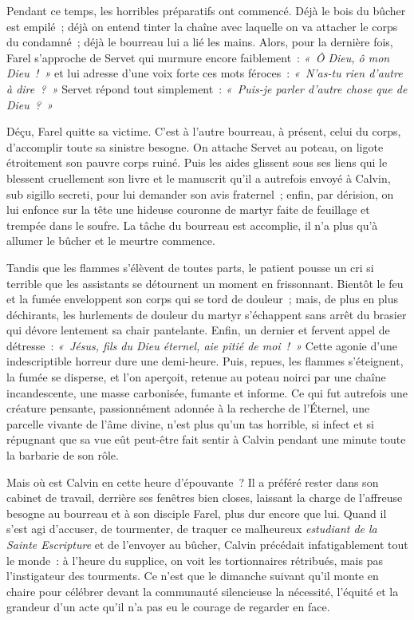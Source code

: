 \documentclass[french,twoside]{book} %
\newcommand\chapterclose{} %
\begin{document}
\noindent Pendant ce temps, les horribles préparatifs ont commencé. Déjà le bois du bûcher est empilé ; déjà on entend tinter la chaîne avec laquelle on va attacher le corps du condamné ; déjà le bourreau lui a lié les mains. Alors, pour la dernière fois, Farel s’approche de Servet qui murmure encore faiblement : \emph{« Ô Dieu, ô mon Dieu ! »} et lui adresse d’une voix forte ces mots féroces : \emph{« N’as-tu rien d’autre à dire ? »} Servet répond tout simplement : \emph{« Puis-je parler d’autre chose que de Dieu ? »}\par
Déçu, Farel quitte sa victime. C’est à l’autre bourreau, à présent, celui du corps, d’accomplir toute sa sinistre besogne. On attache Servet au poteau, on ligote étroitement son pauvre corps ruiné. Puis les aides glissent sous ses liens qui le blessent cruellement son livre et le manuscrit qu’il a autrefois envoyé à Calvin, sub sigillo secreti, pour lui demander son avis fraternel ; enfin, par dérision, on lui enfonce sur la tête une hideuse couronne de martyr faite de feuillage et trempée dans le soufre. La tâche du bourreau est accomplie, il n’a plus qu’à allumer le bûcher et le meurtre commence.\par
Tandis que les flammes s’élèvent de toutes parts, le patient pousse un cri si terrible que les assistants se détournent un moment en frissonnant. Bientôt le feu et la fumée enveloppent son corps qui se tord de douleur ; mais, de plus en plus déchirants, les hurlements de douleur du martyr s’échappent sans arrêt du brasier qui dévore lentement sa chair pantelante. Enfin, un dernier et fervent appel de détresse : \emph{« Jésus, fils du Dieu éternel, aie pitié de moi ! »} Cette agonie d’une indescriptible horreur dure une demi-heure. Puis, repues, les flammes s’éteignent, la fumée se disperse, et l’on aperçoit, retenue au poteau noirci par une chaîne incandescente, une masse carbonisée, fumante et informe. Ce qui fut autrefois une créature pensante, passionnément adonnée à la recherche de l’Éternel, une parcelle vivante de l’âme divine, n’est plus qu’un tas horrible, si infect et si répugnant que sa vue eût peut-être fait sentir à Calvin pendant une minute toute la barbarie de son rôle.\par
Mais où est Calvin en cette heure d’épouvante ? Il a préféré rester dans son cabinet de travail, derrière ses fenêtres bien closes, laissant la charge de l’affreuse besogne au bourreau et à son disciple Farel, plus dur encore que lui. Quand il s’est agi d’accuser, de tourmenter, de traquer ce malheureux \emph{estudiant de la Sainte Escripture} et de l’envoyer au bûcher, Calvin précédait infatigablement tout le monde : à l’heure du supplice, on voit les tortionnaires rétribués, mais pas l’instigateur des tourments. Ce n’est que le dimanche suivant qu’il monte en chaire pour célébrer devant la communauté silencieuse la nécessité, l’équité et la grandeur d’un acte qu’il n’a pas eu le courage de regarder en face.
\chapterclose
\end{document}

